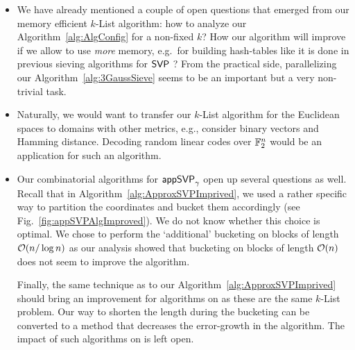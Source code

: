 \begin{itemize}
	\item We have already mentioned a couple of open questions that emerged from our memory efficient $k$-List \SVP algorithm: how to analyze our Algorithm~\ref{alg:AlgConfig} for a non-fixed $k$? How our algorithm will improve if we allow to use \emph{more} memory, e.g.\ for building hash-tables like it is done in previous sieving algorithms for $\textsf{SVP}$ \cite{C:Laarhoven15}? From the practical side, parallelizing our Algorithm~\ref{alg:3GaussSieve} seems to be an important but a very non-trivial task.
	\item Naturally, we would want to transfer our $k$-List algorithm for the Euclidean spaces to domains with other metrics, e.g., consider binary vectors and Hamming distance. Decoding random linear codes over ${{\mathbb F}}_2^n$ would be an application for such an algorithm. 
	\item Our combinatorial algorithms for $\textsf{appSVP}_{\gamma}$ open up several questions as well. Recall that in Algorithm~\ref{alg:ApproxSVPImprived}, we used a rather specific way to partition the coordinates and bucket them accordingly (see Fig.~\ref{fig:appSVPAlgImproved}). We do not know whether this choice is optimal. We chose to perform the `additional' bucketing on blocks of length $\mathcal{O}(n/ \log n)$ as our analysis showed that bucketing on blocks of length $\mathcal{O}(n)$ does not seem to improve the algorithm.
	
	Finally, the same technique as to our Algorithm~\ref{alg:ApproxSVPImprived} should bring an improvement for \BKW algorithms on \LWE as these are the same $k$-List problem. Our way to shorten the length during the bucketing can be converted to a method that decreases the error-growth in the \BKW algorithm. The impact of such algorithms on \LWE is left open.
\end{itemize}